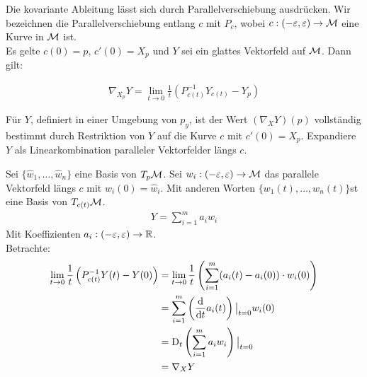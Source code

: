 
Die kovariante Ableitung lässt sich durch Parallelverschiebung ausdrücken.
Wir bezeichnen die Parallelverschiebung entlang $c$ mit $P_c$, wobei $c: (-\varepsilon , \varepsilon) \to \mathcal{M}$ eine Kurve in $\mathcal{M}$ ist.\\
Es gelte $c(0)=p$, $c'(0) = X_p$ und $Y$ sei ein glattes Vektorfeld auf $\mathcal{M}$.
Dann gilt:

\begin{align}
\label{eq:parallelcovd}
\nabla_{X_p} Y = \lim\limits_{t \rightarrow 0} \frac{1}{t} \left( P^{-1}_{c(t)} Y_{c(t)} - Y_p\right) 
\end{align}

\begin{bew}
Für $Y$, definiert in einer Umgebung von $p_y$, ist der Wert $(\nabla_X Y)(p)$ vollständig bestimmt durch Restriktion von $Y$ auf die Kurve $c$ mit $c'(0) = X_p$.
Expandiere $Y$ als Linearkombination paralleler Vektorfelder längs $c$.

Sei $\{ \hat{w}_1, \dots, \hat{w}_n \}$ eine Basis von $T_p \mathcal{M}$.
Sei $w_i : (-\varepsilon, \varepsilon) \to \mathcal{M}$ das parallele Vektorfeld längs $c$ mit $w_i(0) = \hat{w}_i$.
Mit anderen Worten  $\{ w_1(t), \dots, w_n (t)\}$st eine Basis von $T_{c(t)}\mathcal{M}$.
\begin{align}
Y = \sum^m_{i=1} a_i w_i
\end{align}
Mit Koeffizienten $a_i: (-\varepsilon , \varepsilon) \to \mathbb{R}$.\\
Betrachte:
\begin{align}
\lim\limits_{t \rightarrow 0} \frac{1}{t} \left( P^{-1}_{c(t)} Y(t) - Y(0)\right) &=  \lim\limits_{t \rightarrow 0} \frac{1}{t} \left( \sum^m_{i=1} (a_i (t) - a_i (0)) \cdot w_i (0) \right)\\
&= \sum^m_{i=1} \left( \dv{t} a_i (t) \right) \big\vert_{t=0} w_i (0)\\
&= \mathrm{D}_t \left( \sum^m_{i=1} a_i w_i \right) \big\vert_{t=0}\\
&= \nabla_X Y
\end{align}
\end{bew}

